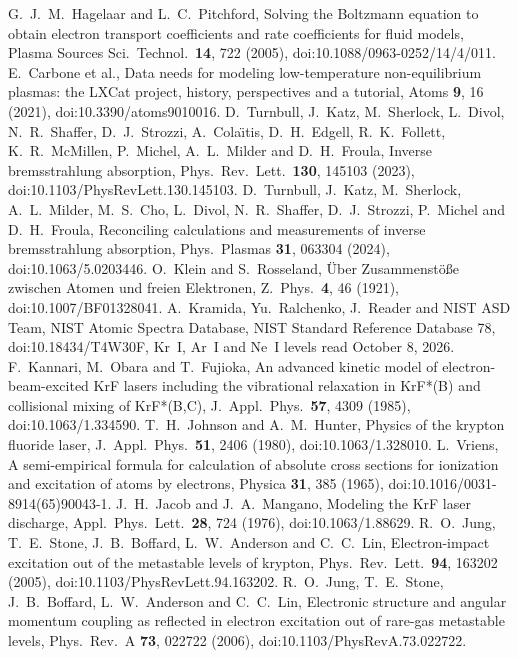  G.~J.~M.~Hagelaar and L.~C.~Pitchford, Solving the Boltzmann equation to obtain electron transport coefficients and rate coefficients for fluid models, Plasma Sources Sci.\ Technol.\ \textbf{14}, 722 (2005), doi:10.1088/0963-0252/14/4/011.
 E.~Carbone et al., Data needs for modeling low-temperature non-equilibrium plasmas: the LXCat project, history, perspectives and a tutorial, Atoms \textbf{9}, 16 (2021), doi:10.3390/atoms9010016.
 D.~Turnbull, J.~Katz, M.~Sherlock, L.~Divol, N.~R.~Shaffer, D.~J.~Strozzi, A.~Cola\"{\i}tis, D.~H.~Edgell, R.~K.~Follett, K.~R.~McMillen, P.~Michel, A.~L.~Milder and D.~H.~Froula, Inverse bremsstrahlung absorption, Phys.\ Rev.\ Lett.\ \textbf{130}, 145103 (2023), doi:10.1103/PhysRevLett.130.145103.
 D.~Turnbull, J.~Katz, M.~Sherlock, A.~L.~Milder, M.~S.~Cho, L.~Divol, N.~R.~Shaffer, D.~J.~Strozzi, P.~Michel and D.~H.~Froula, Reconciling calculations and measurements of inverse bremsstrahlung absorption, Phys.\ Plasmas \textbf{31}, 063304 (2024), doi:10.1063/5.0203446.
 O.~Klein and S.~Rosseland, \"{U}ber Zusammenst\"{o}{\ss}e zwischen Atomen und freien Elektronen, Z.~Phys.\ \textbf{4}, 46 (1921), doi:10.1007/BF01328041.
 A.~Kramida, Yu.~Ralchenko, J.~Reader and NIST ASD Team, NIST Atomic Spectra Database, NIST Standard Reference Database 78, doi:10.18434/T4W30F, Kr~I, Ar~I and Ne~I levels read October 8, 2026.
 F.~Kannari, M.~Obara and T.~Fujioka, An advanced kinetic model of electron-beam-excited KrF lasers including the vibrational relaxation in KrF*(B) and collisional mixing of KrF*(B,C), J.~Appl.\ Phys.\ \textbf{57}, 4309 (1985), doi:10.1063/1.334590.
 T.~H.~Johnson and A.~M.~Hunter, Physics of the krypton fluoride laser, J.~Appl.\ Phys.\ \textbf{51}, 2406 (1980), doi:10.1063/1.328010.
 L.~Vriens, A semi-empirical formula for calculation of absolute cross sections for ionization and excitation of atoms by electrons, Physica \textbf{31}, 385 (1965), doi:10.1016/0031-8914(65)90043-1.
 J.~H.~Jacob and J.~A.~Mangano, Modeling the KrF laser discharge, Appl.\ Phys.\ Lett.\ \textbf{28}, 724 (1976), doi:10.1063/1.88629.
 R.~O.~Jung, T.~E.~Stone, J.~B.~Boffard, L.~W.~Anderson and C.~C.~Lin, Electron-impact excitation out of the metastable levels of krypton, Phys.\ Rev.\ Lett.\ \textbf{94}, 163202 (2005), doi:10.1103/PhysRevLett.94.163202.
 R.~O.~Jung, T.~E.~Stone, J.~B.~Boffard, L.~W.~Anderson and C.~C.~Lin, Electronic structure and angular momentum coupling as reflected in electron excitation out of rare-gas metastable levels, Phys.\ Rev.\ A \textbf{73}, 022722 (2006), doi:10.1103/PhysRevA.73.022722.
